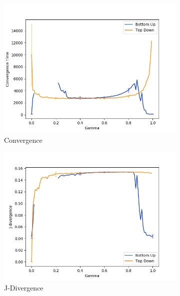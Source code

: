 \begin{figure}
 \centering
  \begin{subfigure}[ht]{0.45\textwidth}
    \includegraphics[width=\textwidth]{Images/Figures/BU+TD/Spiteful/Convergence.png}
    \caption{Convergence}
 \end{subfigure}
 \hfill
 \begin{subfigure}[ht]{0.45\textwidth}
    \includegraphics[width=\textwidth]{Images/Figures/BU+TD/Spiteful/J-Div.png}
    \caption{J-Divergence}
 \end{subfigure}
 \hfill
 \begin{subfigure}[ht]{0.45\textwidth}

\end{subfigure}
\end{figure}
